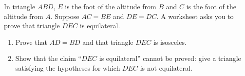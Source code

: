 In triangle $ABD$, $E$ is the foot of the altitude from $B$ and $C$ is the foot of the altitude from $A$. Suppose $AC=BE$ and $DE=DC$. A worksheet asks you to prove that triangle $DEC$ is equilateral.
\begin{enumerate}
\item[(a)] Prove that $AD=BD$ and that triangle $DEC$ is isosceles.
\item[(b)] Show that the claim ``$DEC$ is equilateral'' cannot be proved: give a triangle satisfying the hypotheses for which $DEC$ is not equilateral.
\end{enumerate}
